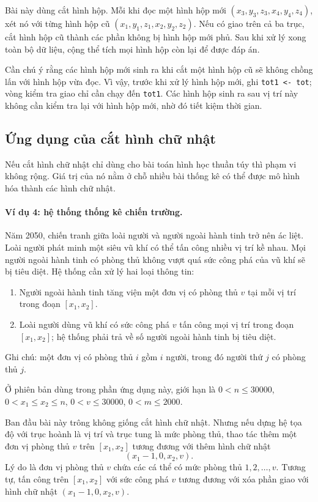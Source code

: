 \documentclass[11pt]{article}
\begin{document}
Bài này dùng cắt hình hộp. Mỗi khi đọc một hình hộp mới
$(x_3,y_3,z_3,x_4,y_4,z_4)$, xét nó với từng hình hộp cũ
$(x_1,y_1,z_1,x_2,y_2,z_2)$. Nếu có giao trên cả ba trục, cắt hình hộp cũ
thành các phần không bị hình hộp mới phủ. Sau khi xử lý xong toàn bộ dữ liệu,
cộng thể tích mọi hình hộp còn lại để được đáp án.

Cần chú ý rằng các hình hộp mới sinh ra khi cắt một hình hộp cũ sẽ không
chồng lấn với hình hộp vừa đọc. Vì vậy, trước khi xử lý hình hộp mới, ghi
\texttt{tot1 <- tot}; vòng kiểm tra giao chỉ cần chạy đến \texttt{tot1}. Các
hình hộp sinh ra sau vị trí này không cần kiểm tra lại với hình hộp mới, nhờ
đó tiết kiệm thời gian.

\subsection{Ứng dụng của cắt hình chữ nhật}

Nếu cắt hình chữ nhật chỉ dùng cho bài toán hình học thuần túy thì phạm vi
không rộng. Giá trị của nó nằm ở chỗ nhiều bài thống kê có thể được mô hình
hóa thành các hình chữ nhật.

\paragraph{Ví dụ 4: hệ thống thống kê chiến trường.}
Năm 2050, chiến tranh giữa loài người và người ngoài hành tinh trở nên ác
liệt. Loài người phát minh một siêu vũ khí có thể tấn công nhiều vị trí kề
nhau. Mọi người ngoài hành tinh có phòng thủ không vượt quá sức công phá của
vũ khí sẽ bị tiêu diệt. Hệ thống cần xử lý hai loại thông tin:
\begin{enumerate}
  \item Người ngoài hành tinh tăng viện một đơn vị có phòng thủ $v$ tại mỗi
  vị trí trong đoạn $[x_1,x_2]$.
  \item Loài người dùng vũ khí có sức công phá $v$ tấn công mọi vị trí trong
  đoạn $[x_1,x_2]$; hệ thống phải trả về số người ngoài hành tinh bị tiêu
  diệt.
\end{enumerate}
Ghi chú: một đơn vị có phòng thủ $i$ gồm $i$ người, trong đó người thứ $j$ có
phòng thủ $j$.

Ở phiên bản dùng trong phần ứng dụng này, giới hạn là
$0<n\le 30000$, $0<x_1\le x_2\le n$, $0<v\le 30000$, $0<m\le 2000$.

Ban đầu bài này trông không giống cắt hình chữ nhật. Nhưng nếu dựng hệ tọa độ
với trục hoành là vị trí và trục tung là mức phòng thủ, thao tác thêm một đơn
vị phòng thủ $v$ trên $[x_1,x_2]$ tương đương với thêm hình chữ nhật
\[
  (x_1-1,0,x_2,v).
\]
Lý do là đơn vị phòng thủ $v$ chứa các cá thể có mức phòng thủ
$1,2,\ldots,v$. Tương tự, tấn công trên $[x_1,x_2]$ với sức công phá $v$
tương đương với xóa phần giao với hình chữ nhật $(x_1-1,0,x_2,v)$.
\end{document}
